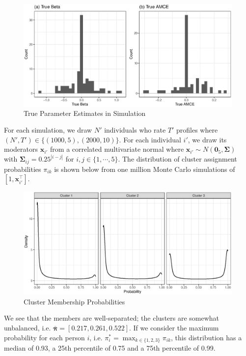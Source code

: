 \begin{figure}[!htbp]
	\caption{True Parameter Estimates in Simulation}
	\includegraphics[width=\textwidth]{figures/sim_truth.eps}
\end{figure}

For each simulation, we draw $N'$ individuals who rate $T'$ profiles where $(N', T') \in \{(1000,5), (2000, 10)\}$. For each individual $i'$, we draw its moderators $\bm{x}_{i'}$ from a correlated multivariate normal where $\bm{x}_{i'} \sim N(\bm{0}_5, \bm{\Sigma})$ with $\bm{\Sigma}_{ij} = 0.25^{|i-j|}$ for $i,j \in \{1, \cdots, 5\}$. The distribution of cluster assignment probabilities $\pi_{ik}$ is shown below from one million Monte Carlo simulations of $[1, \bm{x}_{i'}^\top]$.

\begin{figure}[!htbp]
	\caption{Cluster Membership Probabilities}
	\includegraphics[width=\textwidth]{figures/sim_pi.eps}
\end{figure}

We see that the members are well-separated; the clusters are somewhat unbalanced, i.e. $\bar{\bm{\pi}} = [0.217, 0.261, 0.522]$. If we consider the maximum probability for each person $i$, i.e. $\pi^*_i = \max_{k \in \{1, 2, 3\}} \pi_{ik}$, this distribution has a median of 0.93, a 25th percentile of 0.75 and a 75th percentile of 0.99.

